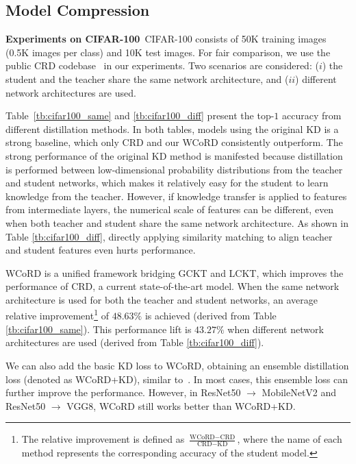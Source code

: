 \documentclass[final]{cvpr}
\theoremstyle{definition}
\begin{document}
\subsection{Model Compression}

\noindent\textbf{Experiments on CIFAR-100}\,
CIFAR-100 \cite{krizhevsky2009learning} consists of 50K training images (0.5K images per class) and 10K test images.
For fair comparison, we use the public CRD codebase~\cite{tian2019contrastive} in our experiments. 
Two scenarios are considered: ($i$) the student and the teacher share the same network architecture, and ($ii$) different network architectures are used. 


Table~\ref{tb:cifar100_same} and \ref{tb:cifar100_diff} present the top-$1$ accuracy from different distillation methods.
In both tables, models using the original KD is a strong baseline, which only CRD and our WCoRD consistently outperform. 
The strong performance of the original KD method is manifested because distillation is performed between low-dimensional probability distributions from the teacher and student networks,
which makes it relatively easy for the student to learn knowledge from the teacher.
However, if knowledge transfer is applied to features from intermediate layers, the numerical scale of features can be different, even when both teacher and student share the same network architecture. As shown in Table \ref{tb:cifar100_diff}, directly applying similarity matching to align teacher and student features even hurts performance. 


WCoRD is a unified framework bridging GCKT and LCKT, which improves the performance of CRD, a current state-of-the-art model. 
When the same network architecture is used for both the teacher and student networks, an average relative improvement\footnote{The relative improvement is defined as $\frac{\text{WCoRD}-\text{CRD}}{\text{CRD} - \text{KD}}$, where the name of each method represents the corresponding accuracy of the student model.} of $48.63\%$ is achieved (derived from Table \ref{tb:cifar100_same}). This performance lift is $43.27\%$ when different network architectures are used (derived from Table \ref{tb:cifar100_diff}).


We can also add the basic KD loss to WCoRD, obtaining an ensemble distillation loss (denoted as WCoRD+KD), similar to~\cite{tian2019contrastive}. In most cases, this ensemble loss can further improve the performance. However, in ResNet50 $\rightarrow$ MobileNetV2 and ResNet50 $\rightarrow$ VGG8, WCoRD still works better than WCoRD+KD.
\end{document}
